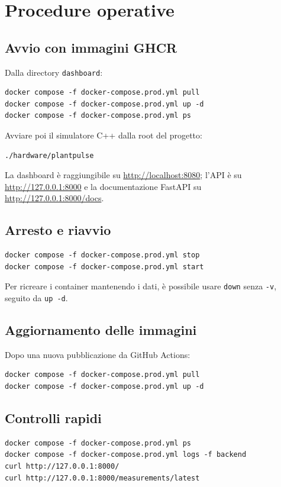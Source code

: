 \chapter{Procedure operative}

\section{Avvio con immagini GHCR}
Dalla directory \texttt{dashboard}:

\begin{lstlisting}
docker compose -f docker-compose.prod.yml pull
docker compose -f docker-compose.prod.yml up -d
docker compose -f docker-compose.prod.yml ps
\end{lstlisting}

Avviare poi il simulatore C++ dalla root del progetto:

\begin{lstlisting}
./hardware/plantpulse
\end{lstlisting}

La dashboard è raggiungibile su \url{http://localhost:8080}; l'API è su \url{http://127.0.0.1:8000} e la documentazione FastAPI su \url{http://127.0.0.1:8000/docs}.

\section{Arresto e riavvio}
\begin{lstlisting}
docker compose -f docker-compose.prod.yml stop
docker compose -f docker-compose.prod.yml start
\end{lstlisting}

Per ricreare i container mantenendo i dati, è possibile usare \texttt{down} senza \texttt{-v}, seguito da \texttt{up -d}.

\section{Aggiornamento delle immagini}
Dopo una nuova pubblicazione da GitHub Actions:

\begin{lstlisting}
docker compose -f docker-compose.prod.yml pull
docker compose -f docker-compose.prod.yml up -d
\end{lstlisting}

\section{Controlli rapidi}
\begin{lstlisting}
docker compose -f docker-compose.prod.yml ps
docker compose -f docker-compose.prod.yml logs -f backend
curl http://127.0.0.1:8000/
curl http://127.0.0.1:8000/measurements/latest
\end{lstlisting}

